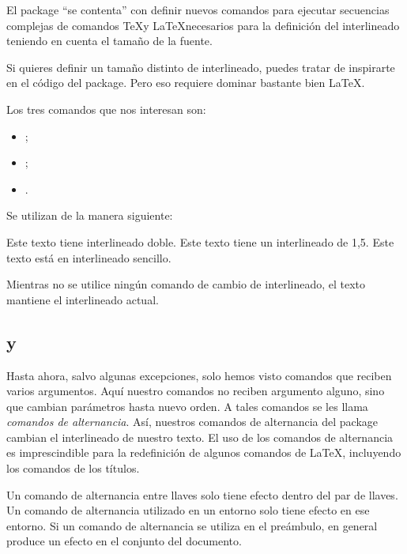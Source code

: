\begin{plusloins}
El package   \enquote{se contenta} con definir nuevos comandos para ejecutar secuencias complejas de comandos \TeX y \LaTeX necesarios para la definición del interlineado teniendo en cuenta el tamaño de la fuente.

Si quieres definir un tamaño distinto de interlineado, puedes tratar de inspirarte en el código del package. Pero eso requiere dominar bastante bien \LaTeX. 
\end{plusloins}

Los tres comandos que nos interesan son:
\begin{itemize}
\item{} ; 
\item{} ; 
\item{}.
\end{itemize}

 Se utilizan de la manera siguiente:

\begin{latexcode}
\doublespacing
Este texto tiene interlineado doble.
\onehalfspacing
Este texto tiene un interlineado de 1,5.
\singlespacing
Este texto está en interlineado sencillo. 
\end{latexcode}

Mientras no se utilice ningún comando de cambio de interlineado, el texto mantiene el interlineado actual. 

\subsection{ y }\label{bascule}

Hasta ahora, salvo algunas excepciones, solo hemos visto comandos que reciben varios argumentos. Aquí nuestro comandos no reciben argumento alguno, sino que cambian parámetros hasta nuevo orden. A tales comandos se les llama \emph{comandos de alternancia}. Así, nuestros comandos de alternancia del package  cambian el interlineado de nuestro texto. El uso de los comandos de alternancia es imprescindible para la redefinición de algunos comandos de \LaTeX, incluyendo los comandos de los títulos.

Un comando de alternancia entre llaves solo tiene efecto dentro del par de llaves. Un comando de alternancia utilizado en un entorno solo tiene efecto en ese entorno. Si un comando de alternancia se utiliza en el preámbulo, en general produce un efecto en el conjunto del documento.\label{porteebascule} 

